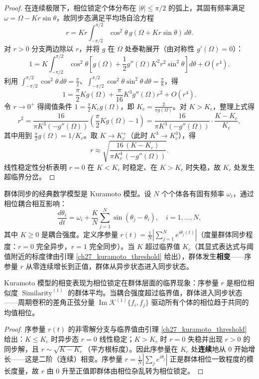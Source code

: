 \begin{proof}
在连续极限下，相位锁定个体分布在 $|\theta| \le \pi/2$ 的弧上，其固有频率满足 $\omega = \Omega - Kr\sin\theta$，故同步态满足平均场自洽方程
\[
r = K r \int_{-\pi/2}^{\pi/2} \cos^2\theta \, g(\Omega + K r \sin\theta)\, d\theta.
\]
对 $r>0$ 分支两边除以 $r$，并将 $g$ 在 $\Omega$ 处泰勒展开（由对称性 $g'(\Omega)=0$）：
\[
1 = K\int_{-\pi/2}^{\pi/2}\cos^2\theta\left[g(\Omega) + \frac12 g''(\Omega)K^2r^2\sin^2\theta\right]d\theta + O(r^4).
\]
利用 $\int_{-\pi/2}^{\pi/2}\cos^2\theta\,d\theta = \frac{\pi}{2}$、$\int_{-\pi/2}^{\pi/2}\cos^2\theta\sin^2\theta\,d\theta = \frac{\pi}{8}$，得
\[
1 = \frac{\pi}{2}Kg(\Omega) + \frac{\pi}{16}K^3g''(\Omega)r^2 + O(r^4).
\]
令 $r\to0^+$ 得阈值条件 $1 = \frac{\pi}{2}K_c g(\Omega)$，即 $K_c = \frac{2}{\pi g(\Omega)}$。对 $K > K_c$，整理上式得
\[
r^2 = \frac{16}{\pi K^3(-g''(\Omega))}\left(\frac{\pi}{2}Kg(\Omega) - 1\right)
= \frac{16}{\pi K^3(-g''(\Omega))}\cdot\frac{K-K_c}{K_c},
\]
其中用到 $\frac{\pi}{2}g(\Omega) = 1/K_c$。取 $K \to K_c^+$（此时 $K^3 \to K_c^3$），得
\[
r \approx \sqrt{\frac{16\,(K-K_c)}{\pi K_c^4\,(-g''(\Omega))}}.
\]
线性稳定性分析表明 $r=0$ 在 $K<K_c$ 时稳定、在 $K>K_c$ 时失稳，故 $K_c$ 处发生超临界分岔。
\end{proof}

\begin{proposition}\label{prop:kuramoto_model}
群体同步的经典数学模型是 Kuramoto 模型。设 $N$ 个个体各有固有频率 $\omega_i$，通过相位耦合相互影响：
\[
\frac{d\theta_i}{dt} = \omega_i + \frac{K}{N} \sum_{j=1}^{N} \sin(\theta_j - \theta_i), \quad i = 1, \dots, N,
\]
其中 $K \ge 0$ 是耦合强度。定义序参量 $r(t) = \frac{1}{N}|\sum_{j=1}^{N} e^{i\theta_j(t)}|$（度量群体同步程度：$r=0$ 完全异步，$r=1$ 完全同步）。当 $K$ 超过临界值 $K_c$（其显式表达式与阈值附近的标度律由引理 \ref{ch27_kuramoto_threshold} 给出），群体发生\textbf{相变}——序参量 $r$ 从零连续增长到正值，群体从异步状态进入同步状态。

Kuramoto 模型的相变表现为相位锁定在群体层面的临界现象：序参量 $r$ 是相位相似度 $\operatorname{Similarity}^{(1)}$ 的群体平均。当耦合强度超过临界值，群体进入同步状态——周期卷积的差角正弦分量 $\operatorname{Im}\mathcal{K}^{(1)}\{f_i, f_j\}$ 驱动所有个体的相位趋于共同的均值相位。
\end{proposition}

\begin{proof}
序参量 $r(t)$ 的非零解分支与临界值由引理 \ref{ch27_kuramoto_threshold} 给出：$K \le K_c$ 时异步态 $r=0$ 线性稳定；$K > K_c$ 时 $r=0$ 失稳并出现 $r>0$ 的同步解，且 $r \sim \sqrt{K-K_c}$（平方根标度）。因此序参量在 $K_c$ 处\textbf{连续}地从 $0$ 开始增长——这是二阶（连续）相变。序参量 $r = \frac{1}{N}|\sum_j e^{i\theta_j}|$ 正是群体相位一致程度的模长度量，故 $r$ 由 $0$ 升至正值即群体由相位杂乱转为相位锁定。
\end{proof}

